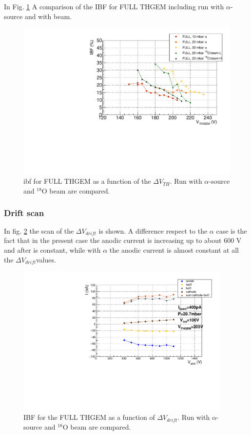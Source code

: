 \documentclass[a4paper, 11 pt]{report}
\newcommand{\Vthgem}{$\Delta V_{TH}$}
\newcommand{\Vdrift}{$ \Delta V_{drift}$}
\begin{document}
  In Fig. \ref{fig:IBF_FULL_thegem_beam} A comparison of the IBF for FULL THGEM including
  run with $\alpha$-source and with beam.
  \begin{figure}[htbp]
	\centering
	\includegraphics[width=\textwidth]{Immagini/IBF_FULL_THGEM.pdf}
	\caption{ibf for FULL THGEM as a function of the \Vthgem{}. Run with $\alpha$-source
	and $^{18}$O beam are compared. }
	\label{fig:IBF_FULL_thegem_beam}
  \end{figure}
  
  \clearpage
 \subsubsection{Drift scan}

  In fig. \ref{fig:DriftScan_FULL_beam} the scan of the \Vdrift{} is shown. A difference respect
  to the $\alpha$ case is the fact that in the present case the anodic current is increasing up to
  about 600 V and after is constant, while with $\alpha$ the anodic current is almost
  constant at all the \Vdrift values.
  \begin{figure}[htbp]
	\centering
	\includegraphics[width=0.95\textwidth]{Immagini/driftScan_THGEM10_20mbar-Vthgem205V-2020-03-09.pdf}
	\caption{IBF for the FULL THGEM as a function of \Vdrift. Run with 
	$\alpha$-source	and $^{18}$O beam are compared.}
	\label{fig:DriftScan_FULL_beam}
  \end{figure}
\end{document}
